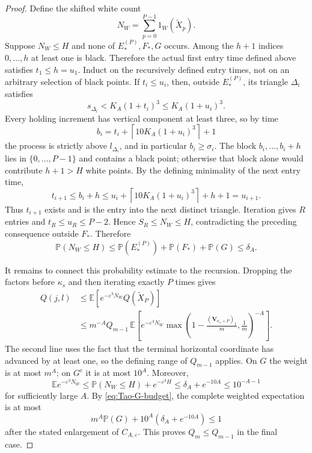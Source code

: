 \begin{proof}
Define the shifted white count
\[
 N_W=\sum_{p=0}^{P-1}1_W(\widetilde X_p).
\]
Suppose \(N_W\le H\) and none of \(E_*^{(P)},F_*,G\) occurs.  Among the
\(h+1\) indices \(0,\ldots,h\) at least one is black.  Therefore the actual
first entry time defined above satisfies \(t_1\le h=u_1\).  Induct on the
recursively defined entry times, not on an arbitrary selection of black
points.  If \(t_i\le u_i\), then, outside \(E_*^{(P)}\), its triangle
\(\Delta_i\) satisfies
\[
 s_{\Delta_i}<K_A(1+t_i)^3\le K_A(1+u_i)^3.
\]
Every holding increment has vertical component at least three, so by time
\[
 b_i=t_i+\left\lceil10K_A(1+u_i)^3\right\rceil+1
\]
the process is strictly above \(l_{\Delta_i}\), and in particular
\(b_i\ge\sigma_i\).  The block \(b_i,\ldots,b_i+h\) lies in
\(\{0,\ldots,P-1\}\) and contains a black point; otherwise that block alone
would contribute \(h+1>H\) white points.  By the defining minimality of the
next entry time,
\[
 t_{i+1}\le b_i+h
 \le u_i+\left\lceil10K_A(1+u_i)^3\right\rceil+h+1
 =u_{i+1}.
\]
Thus \(t_{i+1}\) exists and is the entry into the next distinct triangle.
Iteration gives \(R\) entries and \(t_R\le u_R\le P-2\).  Hence
\(S_R\le N_W\le H\), contradicting the preceding consequence outside
\(F_*\).  Therefore
\begin{equation}
\label{eq:Tao-low-white-budget}
 \mathbb P(N_W\le H)
 \le\mathbb P(E_*^{(P)})+\mathbb P(F_*)+\mathbb P(G)
 \le\delta_A.
\end{equation}

It remains to connect this probability estimate to the recursion.  Dropping
the factors before \(\kappa_s\) and then iterating exactly \(P\) times gives
\begin{align*}
 Q(j,l)
 &\le\mathbb E\left[e^{-\varepsilon^3N_W}Q(\widetilde X_P)\right]\\
 &\le m^{-A}Q_{m-1}\,
 \mathbb E\left[e^{-\varepsilon^3N_W}
 \max\left(1-\frac{(\mathbf V_{\kappa_s+P})_1}{m},
                 \frac1m\right)^{-A}\right].
\end{align*}
The second line uses the fact that the terminal horizontal coordinate has
advanced by at least one, so the defining range of \(Q_{m-1}\) applies.
On \(G\) the weight is at most \(m^A\); on \(G^c\) it is at most \(10^A\).
Moreover,
\[
 \mathbb E e^{-\varepsilon^3N_W}
 \le\mathbb P(N_W\le H)+e^{-\varepsilon^3H}
 \le\delta_A+e^{-10A}\le10^{-A-1}
\]
for sufficiently large \(A\).  By \eqref{eq:Tao-G-budget}, the complete
weighted expectation is at most
\[
 m^A\mathbb P(G)+10^A(\delta_A+e^{-10A})\le1
\]
after the stated enlargement of \(C_{A,\varepsilon}\).  This proves
\(Q_m\le Q_{m-1}\) in the final case.
\end{proof}

